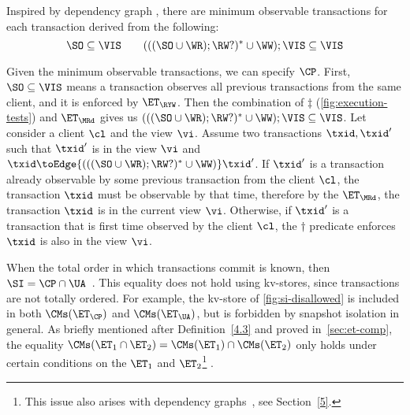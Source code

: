 

Inspired by dependency graph \cite{.....},
there are minimum observable transactions for each transaction derived from the following:
\[
    \SO  \subseteq  \VIS \qquad
    ( ( ( \SO \cup \WR ) ; \RW? )^* \cup \WW ) ; \VIS \subseteq \VIS
\]

Given the minimum observable transactions, we can specify $\CP$. 
First, \( \SO \subseteq \VIS \) means a transaction observes all previous transactions from the same client,
and it is enforced by \( \ET_\RYW \).
Then the combination of \( \ddagger\) (\cref{fig:execution-tests}) and \( \ET_\MRd \) gives us \( ( ( ( \SO \cup \WR ) ; \RW? )^* \cup \WW ) ; \VIS \subseteq \VIS \).
Let consider a client \( \cl \) and the view \( \vi \).
Assume two transactions \( \txid, \txid' \)  such that \( \txid' \) is in the view \( \vi \) and \( \txid \toEdge{( ( ( \SO \cup \WR ) ; \RW? )^* \cup \WW )} \txid' \).
If \( \txid' \) is a transaction already observable by some previous transaction from the client \( \cl \), 
the transaction \( \txid \) must be observable by that time,
therefore by the \( \ET_\MRd \), the transaction \( \txid \) is in the current view \( \vi \).
Otherwise, if \( \txid' \) is a transaction that is first time observed by the client \( \cl \),
the \( \dagger \) predicate enforces \( \txid \) is also in the view
\( \vi \).



When the total order in which transactions commit is known,
then $\SI = \CP \cap \UA$~\cite{gsi,framework-concur}. 
This equality does not hold using kv-stores, since transactions are not totally
ordered. For example, the kv-store of \cref{fig:si-disallowed} is included in both $\CMs(\ET_{\CP})$ and $\CMs(\ET_{\UA})$, 
but is forbidden by snapshot isolation in general.
As briefly mentioned  after Definition~\ref{4.3} and proved in~\cref{sec:et-comp},  the equality \( \CMs(\ET_1
\cap \ET_2) = \CMs(\ET_1) \cap \CMs(\ET_2) \) only holds 
under certain conditions on the \( \ET_1 \) and \( \ET_2 \)\footnote{%
    This issue also arises with dependency graphs~\cite{.}, see  Section~\ref{5}.
} .


